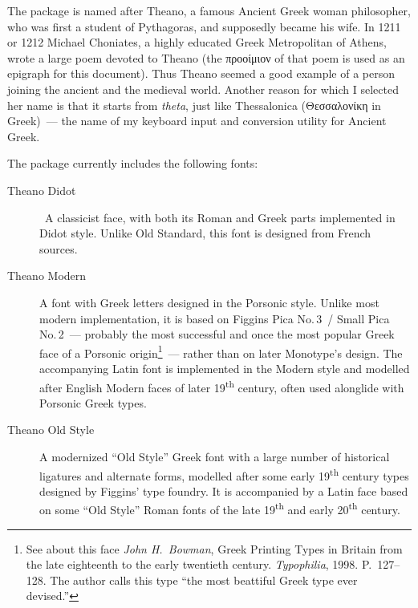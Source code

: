 \documentclass[12pt,a4paper,openany]{article}
\newcommand{\pageheader}[1]{%
	\clearpage
	\pagestyle{fancy}
	\lhead{\LARGE\bfseries#1}
	\cfoot{}
}
\begin{document}
The package is named after Theano, a famous Ancient Greek woman
philosopher, who was first a student of Pythagoras, and supposedly became
his wife. In 1211 or 1212 Michael Choniates, a highly educated Greek
Metropolitan of Athens, wrote a large poem devoted to Theano (the προοίμιον
of that poem is used as an epigraph for this document). Thus Theano seemed a
good example of a person joining the ancient and the medieval world.
Another reason for which I selected her name is that it starts from
\textit{theta}, just like Thessalonica (Θεσσαλονίκη in Greek)~--- the
name of my keyboard input and conversion utility for Ancient Greek.

The package currently includes the following fonts:

\begin{description}

\item[Theano Didot] A classicist face, with both its Roman and Greek
parts implemented in Didot style. Unlike Old Standard, this font is
designed from French sources.

\item[Theano Modern] A font with Greek letters designed in the Porsonic
style. Unlike most modern implementation, it is based on Figgins Pica
No.\,3~/ Small Pica No.\,2~--- probably the most successful and once the most
popular Greek face of a Porsonic origin\footnote{See about this face
\textit{John H.~Bowman}, Greek Printing Types in Britain from the late
eighteenth to the early twentieth century. \textit{Typophilia}, 1998.
P.~127--128. The author calls this type ``the most beattiful Greek type
ever devised.''}~--- rather than on later Monotype's design. The accompanying
Latin font is implemented in the Modern style and modelled after English
Modern faces of later 19\textsuperscript{th} century, often used alonglide
with Porsonic Greek types.

\item[Theano Old Style] A modernized ``Old Style'' Greek font with a large
number of historical ligatures and alternate forms, modelled after some early
19\textsuperscript{th} century types designed by Figgins' type foundry. It
is accompanied by a Latin face based on some ``Old Style'' Roman fonts of the
late 19\textsuperscript{th} and early 20\textsuperscript{th} century.

\end{description}

\pageheader{Theano Didot~--- Roman Characters}
\end{document}
